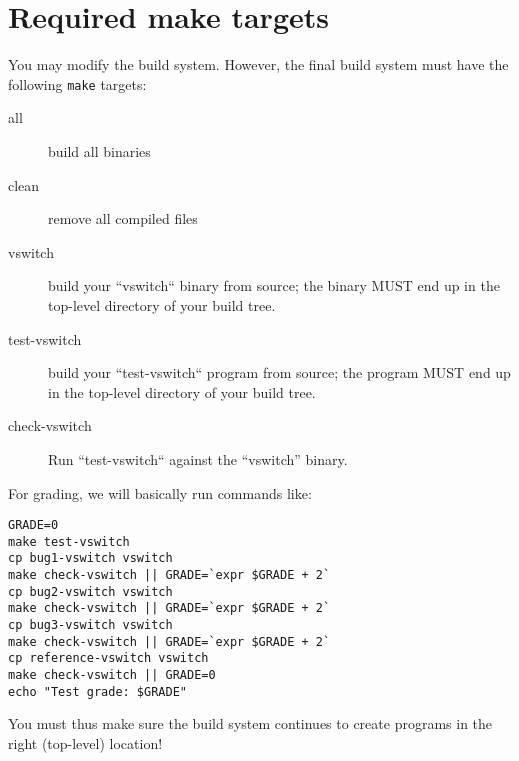 \documentclass{article}
\begin{document}
\section{Required make targets}

You may modify the build system. However, the final build system must
have the following {\tt make} targets:

\begin{description}
\item[all] build all binaries
\item[clean] remove all compiled files
\item[vswitch] build your ``vswitch`` binary from source; the binary MUST end up in the top-level directory of your build tree.
\item[test-vswitch] build your ``test-vswitch`` program from source; the program MUST end up in the top-level directory of your build tree.
\item[check-vswitch] Run ``test-vswitch`` against the ``vswitch'' binary.
\end{description}

For grading, we will basically run commands like:
\begin{verbatim}
GRADE=0
make test-vswitch
cp bug1-vswitch vswitch
make check-vswitch || GRADE=`expr $GRADE + 2`
cp bug2-vswitch vswitch
make check-vswitch || GRADE=`expr $GRADE + 2`
cp bug3-vswitch vswitch
make check-vswitch || GRADE=`expr $GRADE + 2`
cp reference-vswitch vswitch
make check-vswitch || GRADE=0
echo "Test grade: $GRADE"
\end{verbatim}

You must thus make sure the build system continues to create programs
in the right (top-level) location!
\end{document}
